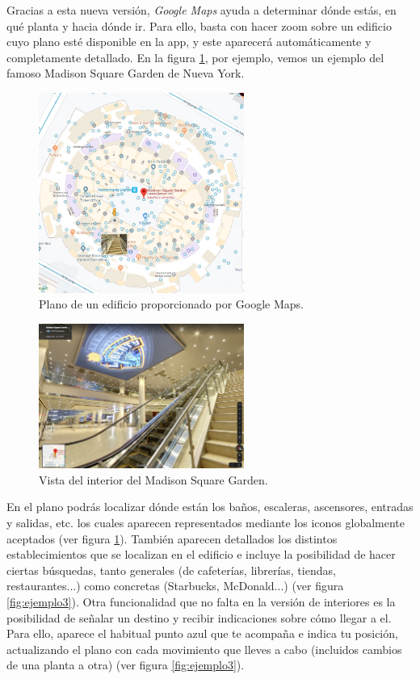 Gracias a esta nueva versión, \textit{Google Maps} ayuda a determinar dónde estás, en qué planta y hacia dónde ir. Para ello, basta con hacer zoom sobre un edificio cuyo plano esté disponible en la app, y este aparecerá automáticamente y completamente detallado. En la figura \ref{fig:ejemplo}, por ejemplo, vemos un ejemplo del famoso Madison Square Garden de Nueva York. 

\begin{figure}[t]
	\centering
	\includegraphics[width=0.6\textwidth]{MadSq2}
	\caption{Plano de un edificio proporcionado por Google Maps.}
	\label{fig:ejemplo}
\end{figure}

\begin{figure}[t]
	\centering
	\includegraphics[width=0.6\textwidth]{MadSq3}
	\caption{Vista del interior del Madison Square Garden. }
	\label{fig:ejemplo2}
\end{figure}

En el plano podrás localizar dónde están los baños, escaleras, ascensores, entradas y salidas, etc. los cuales aparecen representados mediante los iconos globalmente aceptados (ver figura \ref{fig:ejemplo}). También aparecen detallados los distintos establecimientos que se localizan en el edificio e incluye la posibilidad de hacer ciertas búsquedas, tanto generales (de cafeterías, librerías, tiendas, restaurantes...) como concretas (Starbucks, McDonald...) (ver figura \ref{fig:ejemplo3}). Otra funcionalidad que no falta en la versión de interiores es la posibilidad de señalar un destino y recibir indicaciones sobre cómo llegar a el. Para ello, aparece el habitual punto azul que te acompaña e indica tu posición, actualizando el plano con cada movimiento que lleves a cabo (incluidos cambios de una planta a otra) (ver figura \ref{fig:ejemplo3}).

